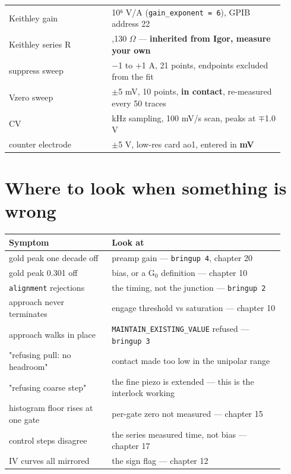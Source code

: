 \small\setlength{\LTleft}{0pt}\setlength{\LTright}{\fill}
\begin{longtable}{@{}>{\raggedright\arraybackslash}p{0.34\linewidth}>{\raggedright\arraybackslash}p{0.58\linewidth}@{}}
\toprule
Keithley gain & 10⁶ V/A (\texttt{gain\_\discretionary{}{}{}exponent = 6}), GPIB address 22 \\
Keithley series R & 106,130 $\Omega$ --- \textbf{inherited from Igor, measure your own} \\
suppress sweep & −1 to +1 \textmu{}A, 21 points, endpoints excluded from the fit \\
Vzero sweep & $\pm$5 mV, 10 points, \textbf{in contact}, re-measured every 50 traces \\
CV & 1 kHz sampling, 100 mV/s scan, peaks at $\mp$1.0 V \\
counter electrode & $\pm$5 V, low-res card ao1, entered in \textbf{mV} \\
\bottomrule
\end{longtable}
\normalsize

\section{Where to look when something is wrong}

\small\setlength{\LTleft}{0pt}\setlength{\LTright}{\fill}
\begin{longtable}{@{}>{\raggedright\arraybackslash}p{0.34\linewidth}>{\raggedright\arraybackslash}p{0.58\linewidth}@{}}
\toprule
\textbf{Symptom} & \textbf{Look at} \\
\midrule\endhead
gold peak one decade off & preamp gain --- \texttt{bringup 4}, chapter 20 \\
gold peak 0.301 off & bias, or a G$_0$ definition --- chapter 10 \\
\texttt{alignment} rejections & the timing, not the junction --- \texttt{bringup 2} \\
approach never terminates & engage threshold vs saturation --- chapter 10 \\
approach walks in place & \texttt{MAINTAIN\_\discretionary{}{}{}EXISTING\_\discretionary{}{}{}VALUE} refused --- \texttt{bringup 3} \\
"refusing pull: no headroom" & contact made too low in the unipolar range \\
"refusing coarse step" & the fine piezo is extended --- this is the interlock working \\
histogram floor rises at one gate & per-gate zero not measured --- chapter 15 \\
control steps disagree & the series measured time, not bias --- chapter 17 \\
IV curves all mirrored & the sign flag --- chapter 12 \\
\bottomrule
\end{longtable}
\normalsize

